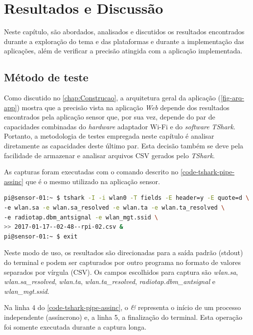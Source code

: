 \chapter{Resultados e Discussão}
\label{chap:resultados}

Neste capítulo, são abordados, analisados e discutidos os resultados encontrados
durante a exploração do tema e das plataformas e durante a implementação das
aplicações, além de verificar a precisão atingida com a aplicação implementada.


\section{Método de teste}
\label{sec:metodo-teste}

Como discutido no \autoref{chap:Construcao}, a arquitetura geral da aplicação (\autoref{fig-arq-app})
mostra que a precisão vista na aplicação \emph{Web} depende dos resultados
encontrados pela aplicação sensor que, por sua vez, depende do par de
capacidades combinadas do \emph{hardware} adaptador Wi-Fi e do \emph{software}
\emph{TShark}. Portanto, a metodologia de testes empregada neste capítulo é
analisar diretamente as capacidades deste último par. Esta decisão também se
deve pela facilidade de armazenar e analisar arquivos CSV gerados pelo
\emph{TShark}.

As capturas foram executadas com o comando descrito no \autoref{code-tshark-pipe-assinc}
que é o mesmo utilizado na aplicação sensor.

\begin{lstlisting}[language=bash,caption={TShark e redirecionamento da saída para arquivo assíncrono},label=code-tshark-pipe-assinc]
pi@sensor-01:~ $ tshark -I -i wlan0 -T fields -E header=y -E quote=d \
-e wlan.sa -e wlan.sa_resolved -e wlan.ta -e wlan.ta_resolved \
-e radiotap.dbm_antsignal -e wlan_mgt.ssid \
>> 2017-01-17--02-48--rpi-02.csv &
pi@sensor-01:~ $ exit
\end{lstlisting}

Neste modo de uso, os resultados são direcionadas para a saída padrão
(stdout)  do terminal e podem ser capturados por outro programa no formato
de valores separados por vírgula (CSV). Os campos escolhidos para captura
são \emph{wlan.sa}, \emph{wlan.sa\_resolved}, \emph{wlan.ta},
\emph{wlan.ta\_resolved}, \emph{radiotap.dbm\_antsignal} e \emph{wlan\_mgt.ssid}.

Na linha 4 do \autoref{code-tshark-pipe-assinc}, o \emph{\&} representa o início
de um processo independente (assíncrono) e, a linha 5, a finalização do terminal.
Esta operação foi somente executada durante a captura longa.


